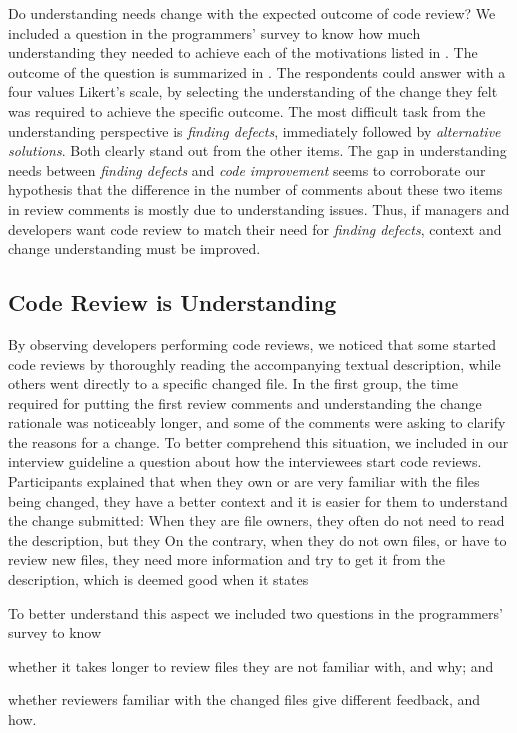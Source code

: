 Do understanding needs change with the expected outcome of code review? We included a question in the programmers' survey to know how much understanding they needed to achieve each of the motivations listed in . The outcome of the question is summarized in . The respondents could answer with a four values Likert's scale, by selecting the understanding of the change they felt was required to achieve the specific outcome. The most difficult task from the understanding perspective is \emph{finding defects}, immediately followed by \emph{alternative solutions}. Both clearly stand out from the other items. The gap in understanding needs between \emph{finding defects} and \emph{code improvement} seems to corroborate our hypothesis that the difference in the number of comments about these two items in review comments is mostly due to understanding issues. Thus, if managers and developers want code review to match their need for \emph{finding defects}, context and change understanding must be improved.


\subsection{Code Review is Understanding}

By observing developers performing code reviews, we noticed that some started code reviews by thoroughly reading the accompanying textual description, while others went directly to a specific changed file. In the first group, the time required for putting the first review comments and understanding the change rationale was noticeably longer, and some of the comments were asking to clarify the reasons for a change. To better comprehend this situation, we included in our interview guideline a question about how the interviewees start code reviews. Participants explained that when they own or are very familiar with the files being changed, they have a better context and it is easier for them to understand the change submitted:  When they are file owners, they often do not need to read the description, but they  On the contrary, when they do not own files, or have to review new files, they need more information and try to get it from the description, which is deemed good when it states 

To better understand this aspect we included two questions in the programmers' survey to know \begin{inparaenum}[(1)]
\item whether it takes longer to review files they are not familiar with, and why; and 
\item whether reviewers familiar with the changed files give different feedback, and how. \end{inparaenum}

